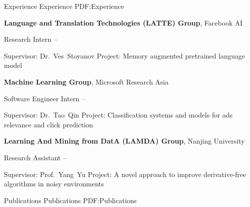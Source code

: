 \documentclass[letterpaper,MMMyyyy,nonstopmode]{simpleresumecv}
\begin{document}
\begin{Body}

\Section
{Experience}
{Experience}
{PDF:Experience}

\Entry
\textbf{Language and Translation Technologies (LATTE) Group},
Facebook AI

\Gap
\BulletItem
Research Intern
\hfill
{} --
\begin{Detail}
\SubBulletItem
Supervisor:
Dr.~Ves~Stoyanov
\SubBulletItem
Project:
Memory augmented pretrained language model
\end{Detail}

\Entry
\textbf{Machine Learning Group},
Microsoft Research Asia

\Gap
\BulletItem
Software Engineer Intern
\hfill
{} --
\begin{Detail}
\SubBulletItem
Supervisor:
Dr.~Tao~Qin
\SubBulletItem
Project:
Classification systems and models for ads relevance and click prediction
\end{Detail}

\BigGap
\Entry
\textbf{Learning And Mining from DatA (LAMDA) Group},
Nanjing University

\Gap
\BulletItem
Research Assistant
\hfill
{} --
\begin{Detail}
\SubBulletItem
Supervisor:
Prof.~Yang~Yu
\SubBulletItem
Project:
A novel approach to improve derivative-free algorithms in noisy environments
\end{Detail}


\Section
{Publications}
{Publications}
{PDF:Publications}






\end{Body}
\end{document}
